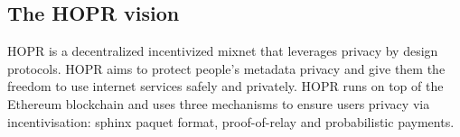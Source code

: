 \subsection{The HOPR vision}
HOPR is a decentralized incentivized mixnet that leverages privacy by design protocols. HOPR aims to protect people's metadata privacy and give them the freedom to use internet services safely and privately. HOPR runs on top of the Ethereum blockchain and uses three mechanisms to ensure users privacy via incentivisation: sphinx paquet format, proof-of-relay and probabilistic payments.




 




